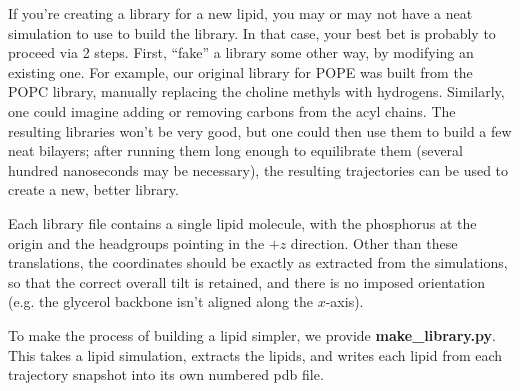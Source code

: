 \documentclass[12pt]{article}
\begin{document}
If you're creating a library for a new lipid, you may or may not have a neat
simulation to use to build the library.  In that case, your best bet is
probably to proceed via 2 steps.  First, ``fake'' a library some other way,
by modifying an existing one.  For example, our original library for POPE was
built from the POPC library, manually replacing the choline methyls with
hydrogens.  Similarly, one could imagine adding or removing carbons from the
acyl chains.  The resulting libraries won't be very good, but one could then
use them to build a few neat bilayers; after running them long enough to
equilibrate them (several hundred nanoseconds may be necessary), the
resulting trajectories can be used to create a new, better library.

Each library file contains a single lipid molecule, with the phosphorus at
the origin and the headgroups pointing in the $+z$ direction.  Other than
these translations, the coordinates should be exactly as extracted from the
simulations, so that the correct overall tilt is retained, and there is no
imposed orientation (e.g. the glycerol backbone isn't aligned along the
$x$-axis).

To make the process of building a lipid simpler, we provide {\bf
make\_library.py}.  This takes a lipid simulation, extracts the lipids, and
writes each lipid from each trajectory snapshot into its own numbered pdb file.
\end{document}
